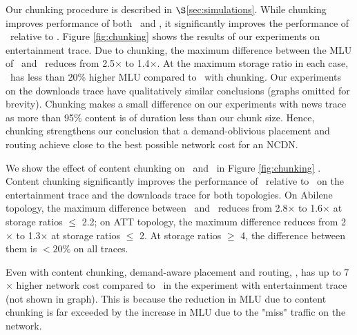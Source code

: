 Our chunking procedure is described in $\S$\ref{sec:simulations}.  While chunking improves performance of both \invlru\ and \optrpfuture, it significantly improves the performance of \invlru\ relative to \optrpfuture. Figure \ref{fig:chunking} shows the results of our experiments on entertainment trace.  Due to chunking, the maximum difference between the MLU of  \invlru\ and \optrpfuture\ reduces from 2.5$\times$ to 1.4$\times$. At the maximum storage ratio in each case, \invlru\ has less than 20\% higher MLU compared to \optrpfuture\ with chunking. Our experiments on the downloads trace have qualitatively similar conclusions (graphs omitted for brevity). Chunking makes a small difference on our experiments with news trace as  more than 95\% content is of duration less than our chunk size.  Hence, chunking strengthens our conclusion that a demand-oblivious placement and routing achieve close to the best possible network cost for an NCDN.













\eat
{
We show the effect of content chunking on \invlru\ and \optrpfuture\ in Figure \ref{fig:chunking} . Content chunking significantly improves the performance of \invlru\ relative to \optrpfuture\ on the entertainment trace and the downloads trace for both topologies. On Abilene topology, the maximum difference between \invlru\ and \optrpfuture\ reduces from 2.8$\times$ to 1.6$\times$  at storage ratios $\leq$ 2.2; on ATT topology, the maximum difference reduces  from  2$\times$ to  1.3$\times$ at storage ratios $\leq$ 2. At storage ratios $\geq$ 4, the difference between them is $< 20\%$ on all traces.
}

Even with content chunking, demand-aware placement and routing,  \optrp, has up to 7$\times$ higher network cost compared to \invlru\ in the experiment with entertainment trace (not shown in graph). This is because the reduction in MLU due to content chunking is far exceeded by  the increase in MLU due to the "miss" traffic on the network.

